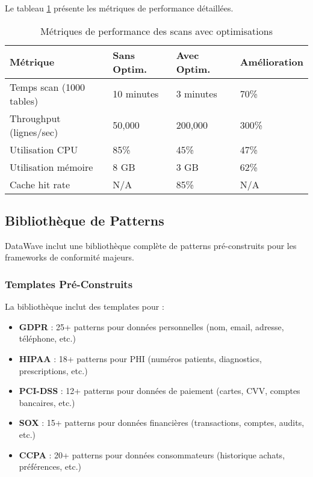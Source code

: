 Le tableau \ref{tab:metriques_performance_scan} présente les métriques de performance détaillées.

\begin{table}[htpb]
\centering
\caption{Métriques de performance des scans avec optimisations}
\label{tab:metriques_performance_scan}
\begin{tabular}{|p{}|p{}|p{}|p{}|}
\hline
\textbf{Métrique} & \textbf{Sans Optim.} & \textbf{Avec Optim.} & \textbf{Amélioration} \\
\hline
Temps scan (1000 tables) & 10 minutes & 3 minutes & 70\% \\
\hline
Throughput (lignes/sec) & 50,000 & 200,000 & 300\% \\
\hline
Utilisation CPU & 85\% & 45\% & 47\% \\
\hline
Utilisation mémoire & 8 GB & 3 GB & 62\% \\
\hline
Cache hit rate & N/A & 85\% & N/A \\
\hline
\end{tabular}
\end{table}

\subsection{Bibliothèque de Patterns}

DataWave inclut une bibliothèque complète de patterns pré-construits pour les frameworks de conformité majeurs.

\subsubsection{Templates Pré-Construits}

La bibliothèque inclut des templates pour :
\begin{itemize}
    \item \textbf{GDPR} : 25+ patterns pour données personnelles (nom, email, adresse, téléphone, etc.)
    \item \textbf{HIPAA} : 18+ patterns pour PHI (numéros patients, diagnostics, prescriptions, etc.)
    \item \textbf{PCI-DSS} : 12+ patterns pour données de paiement (cartes, CVV, comptes bancaires, etc.)
    \item \textbf{SOX} : 15+ patterns pour données financières (transactions, comptes, audits, etc.)
    \item \textbf{CCPA} : 20+ patterns pour données consommateurs (historique achats, préférences, etc.)
\end{itemize}

